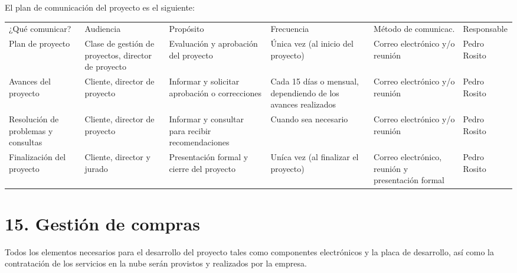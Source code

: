 \documentclass[11pt]{charter}
\begin{document}
El plan de comunicación del proyecto es el siguiente:

\begin{table}[htpb]
\centering
\begin{tabularx}{\linewidth}{@{}|X|C{2.4cm}|C{3cm}|C{1.8cm}|C{2cm}|C{2.1cm}|@{}}
\hline
{} 
           \\ \hline
{} 
¿Qué comunicar? & Audiencia & Propósito & Frecuencia & Método de comunicac. & Responsable \\ \hline
       Plan de proyecto   &     Clase de gestión de proyectos, director de proyecto      &      Evaluación y aprobación del proyecto     &     Única vez (al inicio del proyecto)       &                 Correo electrónico y/o reunión &   Pedro Rosito          \\ \hline
       Avances del proyecto         &     Cliente, director de proyecto      &     Informar y solicitar aprobación o correcciones      &     Cada 15 días o mensual, dependiendo de los avances realizados       &          Correo electrónico y/o reunión            &     Pedro Rosito        \\ \hline
          Resolución de problemas y consultas      &     Cliente, director de proyecto      &     Informar y consultar para recibir recomendaciones      &      Cuando sea necesario      &                     Correo electrónico y/o reunión &     Pedro Rosito        \\ \hline
      Finalización del proyecto          &     Cliente, director y jurado      &     Presentación formal y cierre del proyecto      &     Uníca vez (al finalizar el proyecto)       &                     Correo electrónico, reunión y presentación formal &     Pedro Rosito        \\ \hline

\end{tabularx}
\end{table}

\section{15. Gestión de compras}
\label{sec:compras}

Todos los elementos necesarios para el desarrollo del proyecto tales como componentes electrónicos y la placa de desarrollo, así como la contratación de los servicios en la nube serán provistos y realizados por la empresa.
\end{document}
